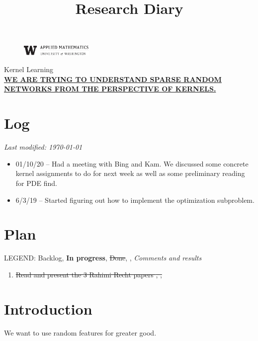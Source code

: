 \documentclass[11pt,letterpaper]{article}
\newcommand{\projectNameShort}{Kernel Learning}
\newcommand{\projectNameLong}{We are trying to understand sparse random networks from the perspective of kernels.}
\newcommand{\univlogo}{%
  \noindent %
  \begin{figure}
    \vspace{-24pt}
    \begin{center}
      \includegraphics[width=0.31\textwidth]{Images/univ-logo.jpg}
    \end{center}
    \vspace{-10pt}
  \end{figure}
}
\numberwithin{equation}{section} %
\numberwithin{figure}{section} %
\numberwithin{table}{section} %
\begin{document}
\title{Research Diary}
\univlogo
{\Huge \projectNameShort}\\[2mm]

{\large \underline{\textbf{\uppercase{\projectNameLong}}}}\\

\section*{Log}
\textit{Last modified: \today}
\begin{itemize}
	\item 01/10/20 -- Had a meeting with Bing and Kam. We discussed some concrete kernel assignments to do for next week as well as some preliminary reading for PDE find.
    \item 6/3/19 -- Started figuring out how to implement the optimization subproblem. 
\end{itemize}

\section*{Plan}
LEGEND: Backlog, \textbf{In progress}, \sout{Done}, , \textit{Comments and results}
\begin{enumerate}
	\item \sout{Read and present the 3 Rahimi Recht papers \cite{RahimiRecht2008UniformApprox}, \cite{RahimiRecht2009KitchenSinks}, \cite{RahimiRecht2008RandomFeatures}}
\end{enumerate}

\listoftodos

\newpage

\section*{Introduction} 
We want to use random features \cite{RahimiRecht2008RandomFeatures} for greater good. 
\end{document}
